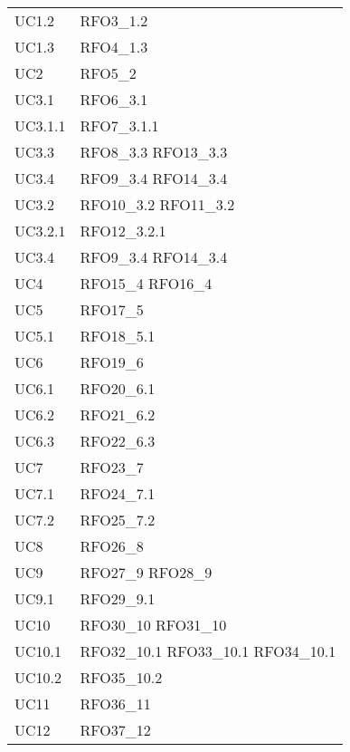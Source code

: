 \begin{longtable}{|C{6cm} C{6cm}|}
	UC1.2 & RFO3\_1.2 \\
	
	UC1.3 & RFO4\_1.3 \\
	
	UC2 & RFO5\_2 \\
	
	UC3.1 & RFO6\_3.1 \\
	
    UC3.1.1 & RFO7\_3.1.1 \\
    
    UC3.3 & RFO8\_3.3 \newline RFO13\_3.3 \\ 
    
    UC3.4 & RFO9\_3.4 \newline RFO14\_3.4 \\
    UC3.2 & RFO10\_3.2 \newline RFO11\_3.2 \\
    UC3.2.1 & RFO12\_3.2.1 \\
    UC3.4 & RFO9\_3.4 \newline RFO14\_3.4 \\
    UC4 & RFO15\_4 \newline RFO16\_4 \\
    UC5 & RFO17\_5 \\
    UC5.1 & RFO18\_5.1 \\
    UC6 & RFO19\_6 \\
    UC6.1 & RFO20\_6.1 \\
    UC6.2 & RFO21\_6.2 \\
    UC6.3 & RFO22\_6.3 \\
    UC7 & RFO23\_7 \\
    UC7.1 & RFO24\_7.1 \\
    UC7.2 & RFO25\_7.2 \\
    UC8 & RFO26\_8 \\
    UC9 & RFO27\_9 \newline RFO28\_9 \\
    UC9.1 & RFO29\_9.1 \\
    UC10 & RFO30\_10 \newline RFO31\_10 \\
    UC10.1 & RFO32\_10.1 \newline RFO33\_10.1 \newline RFO34\_10.1 \\
    UC10.2 & RFO35\_10.2 \\
    UC11 & RFO36\_11 \\
    UC12 & RFO37\_12 \\

\end{longtable}
